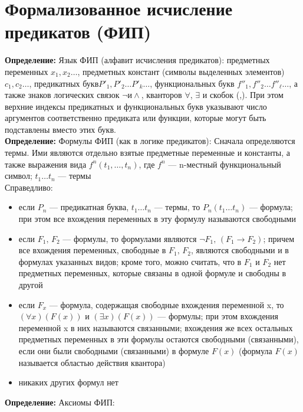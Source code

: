 \documentclass[../main.tex]{subfiles}
\begin{document}
\section{Формализованное исчисление предикатов (ФИП)}
\textbf{Определение:
} Язык ФИП (алфавит исчисления предикатов): предметных переменных $x_1,x_2\ldots$, предметных констант (символы выделенных элементов) $c_1,c_2 \ldots$, предикатных букв$ P'_1,P'_2 \ldots P'_k \ldots$, функциональных букв $f''_1,f''_2 \ldots f''_{\ell} \ldots$, а также знаков логических связок $\lnot и \land$, кванторов $\forall$, $\exists$ и скобок (,). При этом верхние индексы предикатных и функциональных букв указывают число аргументов соответственно предиката или функции, которые могут быть подставлены вместо этих букв. \\
\textbf{
	Определение:
} Формулы ФИП (как в логике предикатов): Сначала определяются термы. Ими являются отдельно взятые предметные переменные и константы, а также выражения вида $f^n(t_1,\ldots,t_n)$, где $f^n$ — n-местный функциональный символ; $t_1 \ldots t_n$ — термы\\
Справедливо:
\begin{itemize}
	\item если $P_n$ — предикатная буква, $t_1 \ldots t_n$ — термы, то $P_n(t_1 \ldots t_n)$ — формула; при этом все вхождения переменных в эту формулу называются свободными
	\item если $F_1,\,F_2$ — формулы, то формулами являются $\lnot F_1,\,(F_1\to F_2)$; причем все вхождения переменных, свободные в $F_1,\,F_2$, являются свободными и в формулах указанных видов; кроме того, можно считать, что в $F_1$ и $F_2$ нет предметных переменных, которые связаны в одной формуле и свободны в другой
	\item если $F_x$ — формула, содержащая свободные вхождения переменной x, то $(\forall x)(F(x))$ и $(\exists x)(F(x))$ — формулы; при этом вхождения переменной x в них называются связанными; вхождения же всех остальных предметных переменных в эти формулы остаются свободными (связанными), если они были свободными (связанными) в формуле $F(x)$ (формула $F(x)$ называется областью действия квантора)
	\item никаких других формул нет 
\end{itemize}
\textbf{Определение:
} Аксиомы ФИП:
\end{document}
